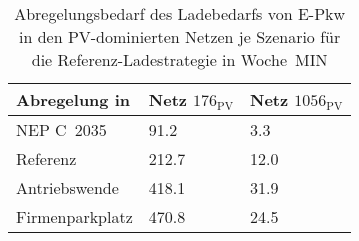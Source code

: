 {
\renewcommand{\arraystretch}{1.2}%
\begin{table}[H]
	\begin{center}
		\caption{Abregelungsbedarf des Ladebedarfs von E-Pkw in den PV-dominierten Netzen je Szenario für die Referenz-Ladestrategie in Woche~MIN}
		\begin{tabu} to 0.6\textwidth {X[1.5] X[1, r] X[1, r]}
			\toprule
			Abregelung in   \si{\mwh}    & Netz \(176_{\text{PV}}\) & Netz \(1056_{\text{PV}}\) \\ \midrule
			NEP C~\num{2035}             & \num{91.2}     & \num{3.3}       \\
			Referenz                     & \num{212.7}    & \num{12.0}      \\
			Antriebswende                & \num{418.1}    & \num{31.9}      \\
			\glqq Firmenparkplatz\grqq{} & \num{470.8}    & \num{24.5}      \\ \bottomrule
		\end{tabu}
		\label{tab:pv_dominated_week_a_epkw_cur}
	\end{center}
	\vspace{-3mm}%
\end{table}
}